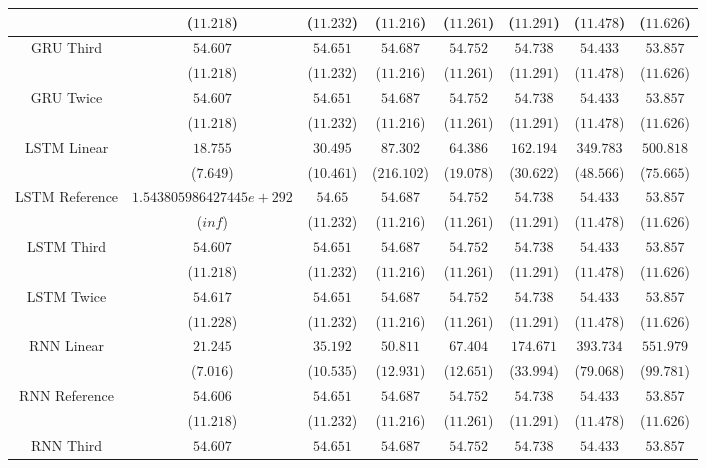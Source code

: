 \begin{table}[!ht]
{\begin{tabular}{|c|c|c|c|c|c|c|c|}
			 & ($11.218$) & ($11.232$) & ($11.216$) & ($11.261$) & ($11.291$) & ($11.478$) & ($11.626$) \\ \hline
			\multirow{2}{*}{GRU Third} & $54.607$ & $54.651$ & $54.687$ & $54.752$ & $54.738$ & $54.433$ & $53.857$ \\
			 & ($11.218$) & ($11.232$) & ($11.216$) & ($11.261$) & ($11.291$) & ($11.478$) & ($11.626$) \\ \hline
			\multirow{2}{*}{GRU Twice} & $54.607$ & $54.651$ & $54.687$ & $54.752$ & $54.738$ & $54.433$ & $53.857$ \\
			 & ($11.218$) & ($11.232$) & ($11.216$) & ($11.261$) & ($11.291$) & ($11.478$) & ($11.626$) \\ \hline
			\multirow{2}{*}{LSTM Linear} & $18.755$ & $30.495$ & $87.302$ & $64.386$ & $162.194$ & $349.783$ & $500.818$ \\
			 & ($7.649$) & ($10.461$) & ($216.102$) & ($19.078$) & ($30.622$) & ($48.566$) & ($75.665$) \\ \hline
			\multirow{2}{*}{LSTM Reference} & $1.543805986427445e+292$ & $54.65$ & $54.687$ & $54.752$ & $54.738$ & $54.433$ & $53.857$ \\
			 & ($inf$) & ($11.232$) & ($11.216$) & ($11.261$) & ($11.291$) & ($11.478$) & ($11.626$) \\ \hline
			\multirow{2}{*}{LSTM Third} & $54.607$ & $54.651$ & $54.687$ & $54.752$ & $54.738$ & $54.433$ & $53.857$ \\
			 & ($11.218$) & ($11.232$) & ($11.216$) & ($11.261$) & ($11.291$) & ($11.478$) & ($11.626$) \\ \hline
			\multirow{2}{*}{LSTM Twice} & $54.617$ & $54.651$ & $54.687$ & $54.752$ & $54.738$ & $54.433$ & $53.857$ \\
			 & ($11.228$) & ($11.232$) & ($11.216$) & ($11.261$) & ($11.291$) & ($11.478$) & ($11.626$) \\ \hline
			\multirow{2}{*}{RNN Linear} & $21.245$ & $35.192$ & $50.811$ & $67.404$ & $174.671$ & $393.734$ & $551.979$ \\
			 & ($7.016$) & ($10.535$) & ($12.931$) & ($12.651$) & ($33.994$) & ($79.068$) & ($99.781$) \\ \hline
			\multirow{2}{*}{RNN Reference} & $54.606$ & $54.651$ & $54.687$ & $54.752$ & $54.738$ & $54.433$ & $53.857$ \\
			 & ($11.218$) & ($11.232$) & ($11.216$) & ($11.261$) & ($11.291$) & ($11.478$) & ($11.626$) \\ \hline
			\multirow{2}{*}{RNN Third} & $54.607$ & $54.651$ & $54.687$ & $54.752$ & $54.738$ & $54.433$ & $53.857$ \\

\end{tabular}}
\end{table}
